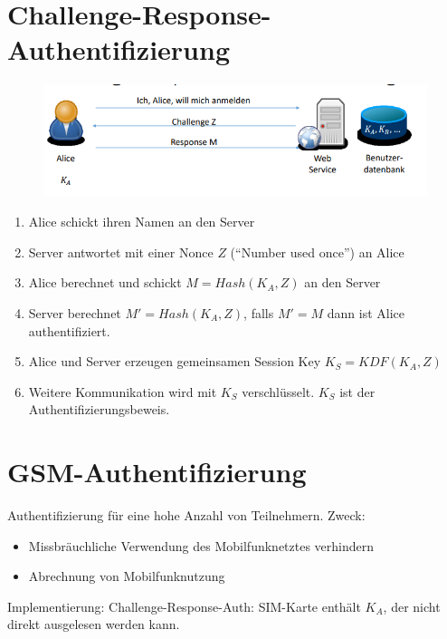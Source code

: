 \section{Challenge-Response-Authentifizierung}
\begin{figure}[H]
	\begin{center}
		\includegraphics[scale=0.8]{Resources/ChallengeResponseAuth.png}
		\caption{}
		\label{fig:ChallengeResponeAuth.png}
	\end{center}
\end{figure}

\begin{enumerate}
	\item Alice schickt ihren Namen an den Server
	\item Server antwortet mit einer Nonce $Z$ (\enquote{Number used once}) an Alice
	\item Alice berechnet und schickt $M = Hash(K_A, Z)$ an den Server
	\item Server berechnet $M' = Hash(K_A, Z)$, falls $M' = M$ dann ist Alice authentifiziert.
	\item Alice und Server erzeugen gemeinsamen Session Key $K_S = KDF(K_A, Z)$
	\item Weitere Kommunikation wird mit $K_S$ verschlüsselt. $K_S$ ist der Authentifizierungsbeweis.
\end{enumerate}

\section{GSM-Authentifizierung}
Authentifizierung für eine hohe Anzahl von Teilnehmern. Zweck:
\begin{itemize}
	\item Missbräuchliche Verwendung des Mobilfunknetztes verhindern
	\item Abrechnung von Mobilfunknutzung
\end{itemize}
Implementierung: Challenge-Response-Auth: SIM-Karte enthält $K_A$, der nicht direkt ausgelesen werden kann.

